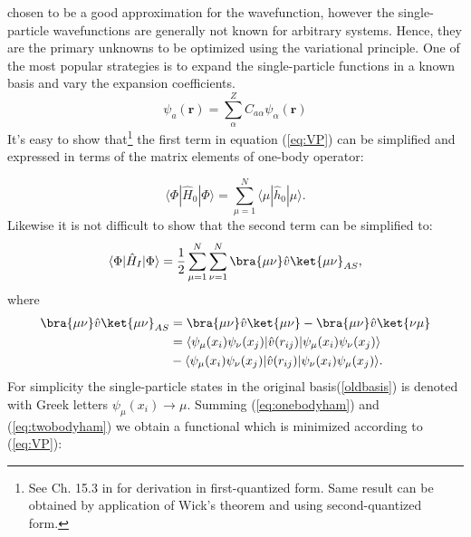 \documentclass[twoside,english]{uiofysmaster}
\begin{document}
chosen to be a good approximation for the wavefunction, however the
single-particle wavefunctions are generally not known for arbitrary
systems. Hence, they are the primary unknowns to be optimized using
the variational principle. One of the most popular strategies is to
expand the single-particle functions in a known basis and vary the
expansion coefficients.
\begin{equation}\label{oldbasis}
\psi_a(\boldsymbol{r}) = \sum_{\alpha}^{Z} C_{a\alpha}\psi_\alpha(\boldsymbol{r})
\end{equation}
It's easy to show that\footnote{See Ch. 15.3 in
	\cite{Hjorth-JensenComputationalPhysicsLecture2015} for derivation
	in first-quantized form. Same result can be obtained by application
	of Wick's theorem and using second-quantized
	form\cite{S.KvaalLectureNotesFysKjm44802015}.} the first term in
equation (\ref{eq:VP}) can be simplified and expressed in terms of the
matrix elements of one-body operator:

\begin{equation}
\langle \Phi|\hat{H}_0|\Phi\rangle  = \sum_{\mu=1}^N \langle \mu | \hat{h}_0 | \mu \rangle.
\label{eq:onebodyham}
\end{equation}
Likewise it is not difficult to show that the second term can be simplified to:
\begin{align}\label{eq:twobodyham}
\begin{split}
\langle \Phi|\hat{H}_I|\Phi\rangle = \frac{1}{2}\sum_{\mu=1}^N\sum_{\nu=1}^N \bra{\mu \nu}\hat{v}\ket{\mu \nu}_{AS},
\end{split}
\end{align}
where
\begin{align*}
\bra{\mu \nu}\hat{v}\ket{\mu \nu}_{AS} &= \bra{\mu \nu}\hat{v}\ket{\mu \nu} - \bra{\mu \nu}\hat{v}\ket{\nu \mu } 
\\ &=\langle \psi_{\mu}(x_i)\psi_{\nu}(x_j)|\hat{v}(r_{ij})|\psi_{\mu}(x_i)\psi_{\nu}(x_j)\rangle\\&-\langle\psi_{\mu}(x_i)\psi_{\nu}(x_j)|\hat{v}(r_{ij})|\psi_{\nu}(x_i)\psi_{\mu}(x_j)\rangle.
\end{align*}
For simplicity the single-particle states in the original
basis(\ref{oldbasis}) is denoted with Greek letters $\psi_{\mu}(x_i)
\rightarrow \mu$. Summing (\ref{eq:onebodyham}) and
(\ref{eq:twobodyham}) we obtain a functional which is minimized
according to (\ref{eq:VP}):
\end{document}

